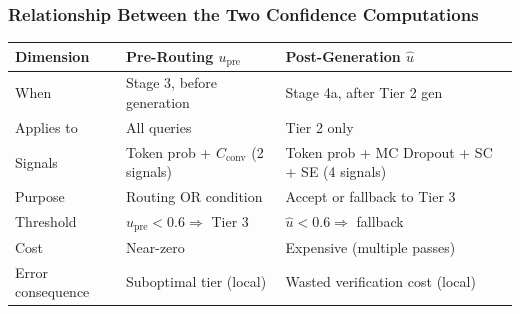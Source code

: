 \documentclass[12pt,a4paper]{article}
\theoremstyle{definition}
\newcommand{\upre}{u_{\text{pre}}}
\newcommand{\uhat}{\hat{u}}
\newcommand{\Cconv}{C_{\text{conv}}}
\begin{document}
\subsubsection{Relationship Between the Two Confidence Computations}

\begin{table}[h]
\centering
\small
\begin{tabular}{lll}
\toprule
\textbf{Dimension} & \textbf{Pre-Routing $\upre$} & \textbf{Post-Generation $\uhat$} \\
\midrule
When & Stage 3, before generation & Stage 4a, after Tier 2 gen \\
Applies to & All queries & Tier 2 only \\
Signals & Token prob + $\Cconv$ (2 signals) & Token prob + MC Dropout + SC + SE (4 signals) \\
Purpose & Routing OR condition & Accept or fallback to Tier 3 \\
Threshold & $\upre < 0.6 \Rightarrow$ Tier 3 & $\uhat < 0.6 \Rightarrow$ fallback \\
Cost & Near-zero & Expensive (multiple passes) \\
Error consequence & Suboptimal tier (local) & Wasted verification cost (local) \\
\bottomrule
\end{tabular}
\end{table}
\end{document}
